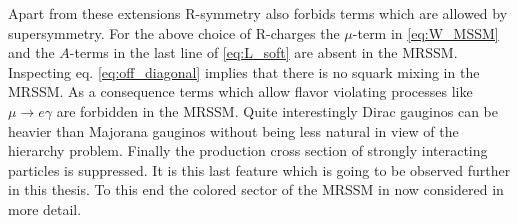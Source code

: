 Apart from these extensions R-symmetry also forbids terms which are allowed by supersymmetry. For the above choice of R-charges the $\mu$-term in \ref{eq:W_MSSM} and the $A$-terms in the last line of \ref{eq:L_soft} are absent in the MRSSM. Inspecting eq. \ref{eq:off_diagonal} implies that there is no squark mixing in the MRSSM. As a consequence terms which allow flavor violating processes like $\mu \to e \gamma$ are forbidden in the MRSSM\cite{Kribs:2007ac}. 
Quite interestingly Dirac gauginos can be heavier than Majorana gauginos without being less natural in view of the hierarchy problem\cite{Nelson:2002ca, Kribs:2012gx, Hardy:2013ywa}. Finally the production cross section of strongly interacting particles is suppressed\cite{Kribs:2012gx, Kribs:2013oda}. It is this last feature which is going to be observed further in this thesis. To this end the colored sector of the MRSSM in now considered in more detail.


